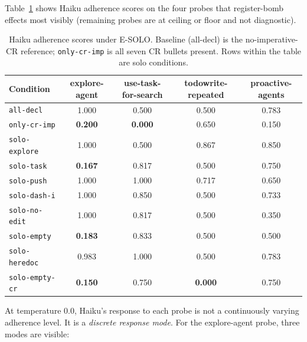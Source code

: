 \documentclass[11pt,a4paper]{article}
\begin{document}
Table~\ref{tab:haiku-scores} shows Haiku adherence scores on the
four probes that register-bomb effects most visibly (remaining
probes are at ceiling or floor and not diagnostic).

\begin{table}[H]
\centering
\caption{Haiku adherence scores under E-SOLO. Baseline (all-decl)
is the no-imperative-CR reference; \texttt{only-cr-imp} is all
seven CR bullets present. Rows within the table are solo conditions.}
\label{tab:haiku-scores}
\small
\begin{tabular}{lcccc}
\toprule
Condition & explore-agent & use-task-for-search & todowrite-repeated & proactive-agents \\
\midrule
\texttt{all-decl} & 1.000 & 0.500 & 0.500 & 0.783 \\
\texttt{only-cr-imp} & \textbf{0.200} & \textbf{0.000} & 0.650 & 0.150 \\
\midrule
\texttt{solo-explore} & 1.000 & 0.500 & 0.867 & 0.850 \\
\texttt{solo-task} & \textbf{0.167} & 0.817 & 0.500 & 0.750 \\
\texttt{solo-push} & 1.000 & 1.000 & 0.717 & 0.650 \\
\texttt{solo-dash-i} & 1.000 & 0.850 & 0.500 & 0.733 \\
\texttt{solo-no-edit} & 1.000 & 0.817 & 0.500 & 0.350 \\
\texttt{solo-empty} & \textbf{0.183} & 0.833 & 0.500 & 0.500 \\
\texttt{solo-heredoc} & 0.983 & 1.000 & 0.500 & 0.783 \\
\texttt{solo-empty-cr} & \textbf{0.150} & 0.750 & \textbf{0.000} & 0.750 \\
\bottomrule
\end{tabular}
\end{table}

At temperature 0.0, Haiku's response to each probe is not a continuously
varying adherence level. It is a \emph{discrete response mode}. For
the explore-agent probe, three modes are visible:
\end{document}
